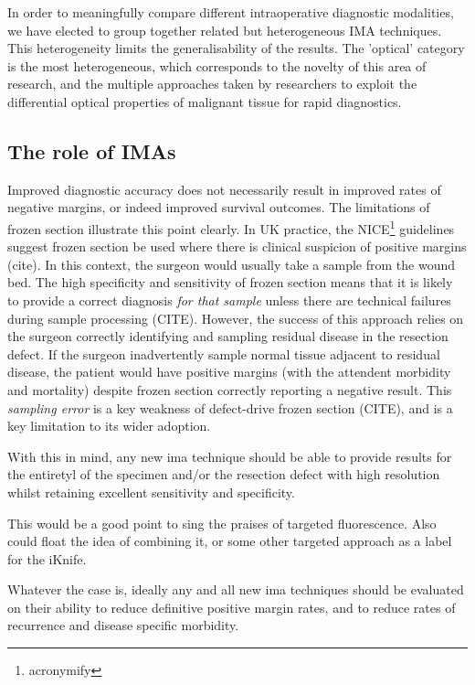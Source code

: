 In order to meaningfully compare different intraoperative diagnostic modalities, we have elected to group together related but heterogeneous IMA techniques. 
This heterogeneity limits the generalisability of the results.
The 'optical' category is the most heterogeneous, which corresponds to the novelty of this area of research, and the multiple approaches taken by researchers to exploit the differential optical properties of malignant tissue for rapid diagnostics.


\subsection{The role of IMAs}

Improved diagnostic accuracy does not necessarily result in improved rates of negative margins, or indeed improved survival outcomes.
The limitations of frozen section illustrate this point clearly.
In UK practice, the NICE\footnote{acronymify} guidelines suggest frozen section be used where there is clinical suspicion of positive margins (cite).
In this context, the surgeon would usually take a sample from the wound bed.
The high specificity and sensitivity of frozen section means that it is likely to provide a correct diagnosis \textit{for that sample} unless there are technical failures during sample processing (CITE).
However, the success of this approach relies on the surgeon correctly identifying and sampling residual disease in the resection defect. 
If the surgeon inadvertently sample normal tissue adjacent to residual disease, the patient would have positive margins (with the attendent morbidity and mortality) despite frozen section correctly reporting a negative result.
This \textit{sampling error} is a key weakness of defect-drive frozen section (CITE), and is a key limitation to its wider adoption.

With this in mind, any new \gls{ima} technique should be able to provide results for the entiretyl of the specimen and/or the resection defect with high resolution whilst retaining excellent sensitivity and specificity.

This would be a good point to sing the praises of targeted fluorescence.
Also could float the idea of combining it, or some other targeted approach as a label for the iKnife.


Whatever the case is, ideally any and all new \gls{ima} techniques should be evaluated on their ability to reduce definitive positive margin rates, and to reduce rates of recurrence and disease specific morbidity.

